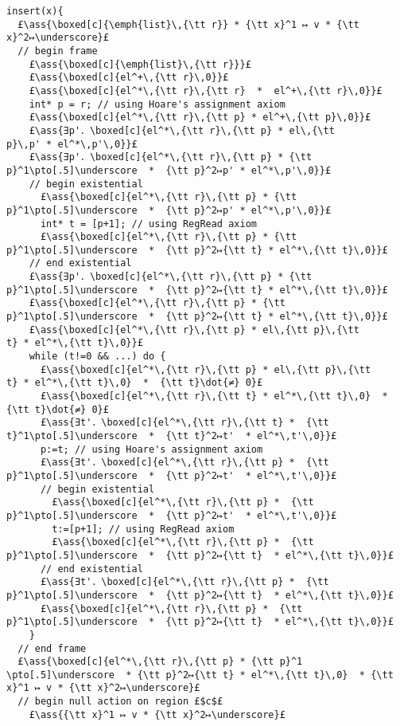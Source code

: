 \documentclass[12pt,a4paper]{article}
\makeatletter
\newcommand{\ml}[2][t]{\mbox{\mdseries\begin{tabular}[#1]{@{}L@{}}#2\end{tabular}}}
\newcommand{\ass}[1]{\ensuremath{{\color{blue}\left\{\ml[c]{#1}\right\}}}}
\renewcommand{\boxed}[2][]{{\textbf{[}}#2{\textbf{]}}_{#1}}
\makeatother
\begin{document}
\begin{lstlisting}
insert(x){
  £\ass{\boxed[c]{\emph{list}\,{\tt r}} * {\tt x}^1 ↦ v * {\tt x}^2↦\underscore}£
  // begin frame
    £\ass{\boxed[c]{\emph{list}\,{\tt r}}}£
    £\ass{\boxed[c]{el^+\,{\tt r}\,0}}£
    £\ass{\boxed[c]{el^*\,{\tt r}\,{\tt r}  *  el^+\,{\tt r}\,0}}£
    int* p = r; // using Hoare's assignment axiom
    £\ass{\boxed[c]{el^*\,{\tt r}\,{\tt p} * el^+\,{\tt p}\,0}}£
    £\ass{∃p'．\boxed[c]{el^*\,{\tt r}\,{\tt p} * el\,{\tt p}\,p' * el^*\,p'\,0}}£
    £\ass{∃p'．\boxed[c]{el^*\,{\tt r}\,{\tt p} * {\tt p}^1\pto[.5]\underscore  *  {\tt p}^2↦p' * el^*\,p'\,0}}£
    // begin existential
      £\ass{\boxed[c]{el^*\,{\tt r}\,{\tt p} * {\tt p}^1\pto[.5]\underscore  *  {\tt p}^2↦p' * el^*\,p'\,0}}£
      int* t = [p+1]; // using RegRead axiom
      £\ass{\boxed[c]{el^*\,{\tt r}\,{\tt p} * {\tt p}^1\pto[.5]\underscore  *  {\tt p}^2↦{\tt t} * el^*\,{\tt t}\,0}}£
    // end existential
    £\ass{∃p'．\boxed[c]{el^*\,{\tt r}\,{\tt p} * {\tt p}^1\pto[.5]\underscore  *  {\tt p}^2↦{\tt t} * el^*\,{\tt t}\,0}}£
    £\ass{\boxed[c]{el^*\,{\tt r}\,{\tt p} * {\tt p}^1\pto[.5]\underscore  *  {\tt p}^2↦{\tt t} * el^*\,{\tt t}\,0}}£
    £\ass{\boxed[c]{el^*\,{\tt r}\,{\tt p} * el\,{\tt p}\,{\tt t} * el^*\,{\tt t}\,0}}£
    while (t!=0 && ...) do {
      £\ass{\boxed[c]{el^*\,{\tt r}\,{\tt p} * el\,{\tt p}\,{\tt t} * el^*\,{\tt t}\,0}  *  {\tt t}\dot{≠} 0}£
      £\ass{\boxed[c]{el^*\,{\tt r}\,{\tt t} * el^*\,{\tt t}\,0}  *  {\tt t}\dot{≠} 0}£
      £\ass{∃t'．\boxed[c]{el^*\,{\tt r}\,{\tt t} *  {\tt t}^1\pto[.5]\underscore  *  {\tt t}^2↦t'  * el^*\,t'\,0}}£
      p:=t; // using Hoare's assignment axiom
      £\ass{∃t'．\boxed[c]{el^*\,{\tt r}\,{\tt p} *  {\tt p}^1\pto[.5]\underscore  *  {\tt p}^2↦t'  * el^*\,t'\,0}}£
      // begin existential
        £\ass{\boxed[c]{el^*\,{\tt r}\,{\tt p} *  {\tt p}^1\pto[.5]\underscore  *  {\tt p}^2↦t'  * el^*\,t'\,0}}£
        t:=[p+1]; // using RegRead axiom
        £\ass{\boxed[c]{el^*\,{\tt r}\,{\tt p} *  {\tt p}^1\pto[.5]\underscore  *  {\tt p}^2↦{\tt t}  * el^*\,{\tt t}\,0}}£
      // end existential
      £\ass{∃t'．\boxed[c]{el^*\,{\tt r}\,{\tt p} *  {\tt p}^1\pto[.5]\underscore  *  {\tt p}^2↦{\tt t}  * el^*\,{\tt t}\,0}}£
      £\ass{\boxed[c]{el^*\,{\tt r}\,{\tt p} *  {\tt p}^1\pto[.5]\underscore  *  {\tt p}^2↦{\tt t}  * el^*\,{\tt t}\,0}}£
    }
  // end frame
  £\ass{\boxed[c]{el^*\,{\tt r}\,{\tt p} * {\tt p}^1 \pto[.5]\underscore  * {\tt p}^2↦{\tt t} * el^*\,{\tt t}\,0}  * {\tt x}^1 ↦ v * {\tt x}^2↦\underscore}£
  // begin null action on region £$c$£
    £\ass{{\tt x}^1 ↦ v * {\tt x}^2↦\underscore}£

\end{lstlisting}
\end{document}

